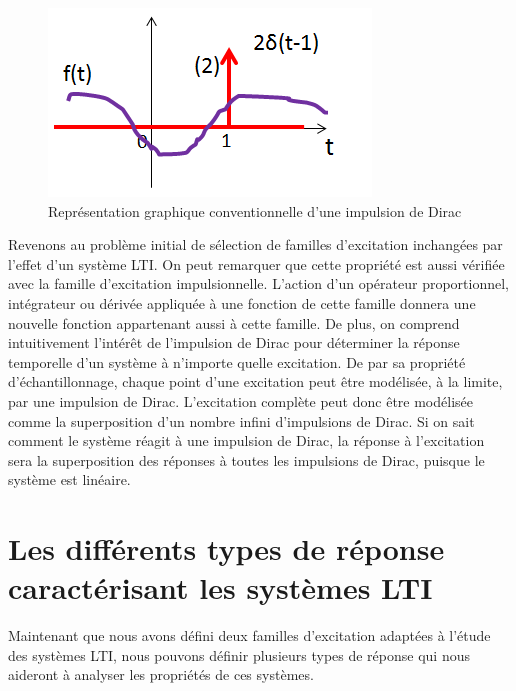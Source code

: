 	
	
	\begin{figure}[h!]
		\centering
		\includegraphics[scale=0.6]{images/representation_Dirac.png}
		\caption{Représentation graphique conventionnelle d'une impulsion de Dirac}	
		\label{Fig:representation_Dirac} 
	\end{figure}
	
	\vspace{1\baselineskip}
	Revenons au problème initial de sélection de familles d'excitation inchangées par l'effet d'un système LTI. On peut remarquer que cette propriété est aussi vérifiée avec la famille d'excitation impulsionnelle. L'action d'un opérateur proportionnel, intégrateur ou dérivée appliquée à une fonction de cette famille donnera une nouvelle fonction appartenant aussi à cette famille. De plus, on comprend intuitivement l'intérêt de l'impulsion de Dirac pour déterminer la réponse temporelle d'un système à n'importe quelle excitation. De par sa propriété d'échantillonnage, chaque point d'une excitation peut être modélisée, à la limite, par une impulsion de Dirac. L'excitation complète peut donc être modélisée comme la superposition d'un nombre infini d'impulsions de Dirac. Si on sait comment le système réagit à une impulsion de Dirac, la réponse à l'excitation sera la superposition des réponses à toutes les impulsions de Dirac, puisque le système est linéaire.
	
	\vspace{1\baselineskip}
	
	
	\section{Les différents types de réponse caractérisant les systèmes LTI}
	Maintenant que nous avons défini deux familles d'excitation adaptées à l'étude des systèmes LTI, nous pouvons définir plusieurs types de réponse qui nous aideront à analyser les propriétés de ces systèmes.
		
	
